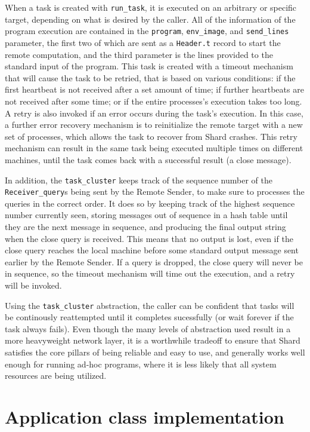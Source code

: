 \documentclass[twoside]{report}
\begin{document}
When a task is created with \texttt{run\_task}, it is executed on an arbitrary or specific target, depending on what is desired by the caller.
All of the information of the program execution are contained in the \texttt{program}, \texttt{env\_image}, and \texttt{send\_lines} parameter, the first two of which are sent as a \texttt{Header.t} record to start the remote computation, and the third parameter is the lines provided to the standard input of the program.
This task is created with a timeout mechanism that will cause the task to be retried, that is based on various conditions: if the first heartbeat is not received after a set amount of time; if further heartbeats are not received after some time; or if the entire processes's execution takes too long.
A retry is also invoked if an error occurs during the task's execution.
In this case, a further error recovery mechanism is to reinitialize the remote target with a new set of processes, which allows the task to recover from Shard crashes.
This retry mechanism can result in the same task being executed multiple times on different machines, until the task comes back with a successful result (a close message).

In addition, the \texttt{task\_cluster} keeps track of the sequence number of the \texttt{Receiver\_query}s being sent by the Remote Sender, to make sure to processes the queries in the correct order.
It does so by keeping track of the highest sequence number currently seen, storing messages out of sequence in a hash table until they are the next message in sequence, and producing the final output string when the close query is received.
This means that no output is lost, even if the close query reaches the local machine before some standard output message sent earlier by the Remote Sender.
If a query is dropped, the close query will never be in sequence, so the timeout mechanism will time out the execution, and a retry will be invoked.

Using the \texttt{task\_cluster} abstraction, the caller can be confident that tasks will be continously reattempted until it completes sucessfully (or wait forever if the task always fails).
Even though the many levels of abstraction used result in a more heavyweight network layer, it is a worthwhile tradeoff to ensure that Shard satisfies the core pillars of being reliable and easy to use, and generally works well enough for running ad-hoc programs, where it is less likely that all system resources are being utilized.

\section{Application class implementation}
\end{document}
